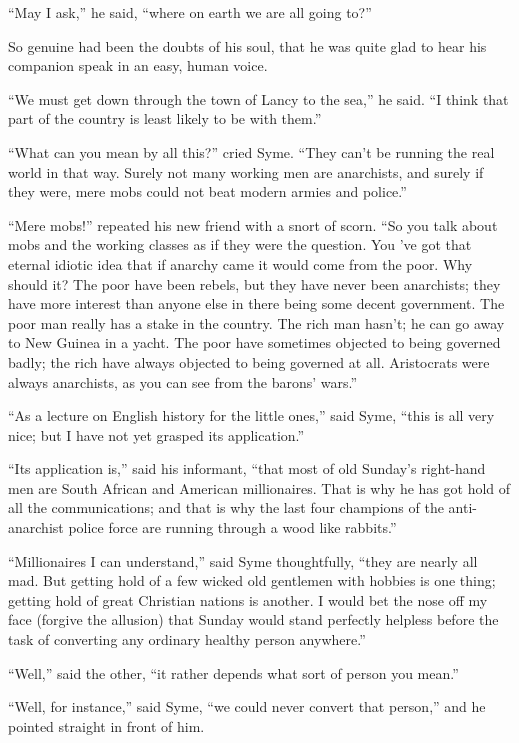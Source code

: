 \documentclass{book}
\begin{document}
“May I ask,” he said, “where on earth we are all going to?”

So genuine had been the doubts of his soul, that he was quite glad to hear his companion speak in an easy, human voice.

“We must get down through the town of Lancy to the sea,” he said. “I think that part of the country is least likely to be with them.”

“What can you mean by all this?” cried Syme. “They can’t be running the real world in that way. Surely not many working men are anarchists, and surely if they were, mere mobs could not beat modern armies and police.”

“Mere mobs!” repeated his new friend with a snort of scorn. “So you talk about mobs and the working classes as if they were the question. You 've got that eternal idiotic idea that if anarchy came it would come from the poor. Why should it? The poor have been rebels, but they have never been anarchists; they have more interest than anyone else in there being some decent government. The poor man really has a stake in the country. The rich man hasn’t; he can go away to New Guinea in a yacht. The poor have sometimes objected to being governed badly; the rich have always objected to being governed at all. Aristocrats were always anarchists, as you can see from the barons’ wars.”

“As a lecture on English history for the little ones,” said Syme, “this is all very nice; but I have not yet grasped its application.”

“Its application is,” said his informant, “that most of old Sunday’s right-hand men are South African and American millionaires. That is why he has got hold of all the communications; and that is why the last four champions of the anti-anarchist police force are running through a wood like rabbits.”

“Millionaires I can understand,” said Syme thoughtfully, “they are nearly all mad. But getting hold of a few wicked old gentlemen with hobbies is one thing; getting hold of great Christian nations is another. I would bet the nose off my face (forgive the allusion) that Sunday would stand perfectly helpless before the task of converting any ordinary healthy person anywhere.”

“Well,” said the other, “it rather depends what sort of person you mean.”

“Well, for instance,” said Syme, “we could never convert that person,” and he pointed straight in front of him.
\end{document}
